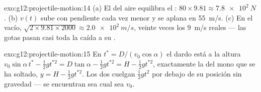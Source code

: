 \begin{solution}{exo:g12:projectile-motion:14}
(a) El  del aire equilibra el :
$80 \times 9.81 \approx \qty{7.8e2}{N}$. (b) $v(t)$ sube con pendiente
cada vez menor y se aplana en \qty{55}{m/s}. (c) En el vacío,
$\sqrt{2 \times 9.81 \times 2000} \approx \qty{2.0e2}{m/s}$, veinte
veces los \qty{9}{m/s} reales --- las gotas pasan casi toda la caída a
su .
\end{solution}

\begin{solution}{exo:g12:projectile-motion:15}
En $t^* = D/(v_0\cos\alpha)$ el dardo está a la altura
$v_0\sin\alpha\, t^* - \tfrac12 g t^{*2} = D\tan\alpha - \tfrac12 g
t^{*2} = H - \tfrac12 g t^{*2}$, exactamente la del mono que se ha
soltado, $y = H - \tfrac12 g t^{*2}$. Los dos cuelgan $\tfrac12 gt^2$
por debajo de su posición sin gravedad --- se encuentran sea cual sea
$v_0$.
\end{solution}

